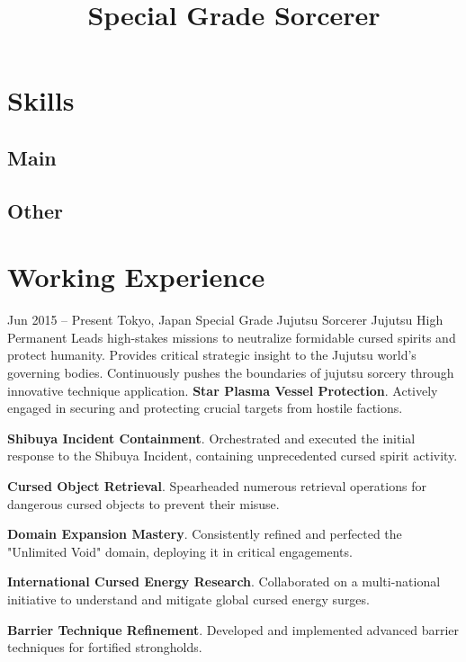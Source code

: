 \documentclass[roman,11pt]{moderncv}
\title{Special Grade Sorcerer}
\begin{document}
\makecvtitle

\section{\faCode{} Skills}
\subsection{Main}

\subsection{Other}


\section{\faBriefcase{} Working Experience}

\cventry
{Jun 2015 -- Present}
{Tokyo, Japan}
{Special Grade Jujutsu Sorcerer}
{Jujutsu High}
{Permanent}
{Leads high-stakes missions to neutralize formidable cursed spirits and protect humanity. Provides critical strategic insight to the Jujutsu world's governing bodies. Continuously pushes the boundaries of jujutsu sorcery through innovative technique application.}
\cvlistitem
{\textbf{Star Plasma Vessel Protection}. Actively engaged in securing and protecting crucial targets from hostile factions.}

\cvlistitem
{\textbf{Shibuya Incident Containment}. Orchestrated and executed the initial response to the Shibuya Incident, containing unprecedented cursed spirit activity.}

\cvlistitem
{\textbf{Cursed Object Retrieval}. Spearheaded numerous retrieval operations for dangerous cursed objects to prevent their misuse.}

\cvlistitem
{\textbf{Domain Expansion Mastery}. Consistently refined and perfected the "Unlimited Void" domain, deploying it in critical engagements.}

\cvlistitem
{\textbf{International Cursed Energy Research}. Collaborated on a multi-national initiative to understand and mitigate global cursed energy surges.}

\cvlistitem
{\textbf{Barrier Technique Refinement}. Developed and implemented advanced barrier techniques for fortified strongholds.}
\end{document}
